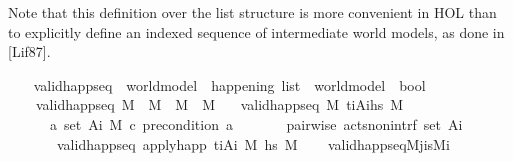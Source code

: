 \begin{isabellebody}
\begin{isamarkuptext}
    Note that this definition over the list structure is more convenient in HOL
    than to explicitly define an indexed sequence  of intermediate world
    models, as done in [Lif87].%
\end{isamarkuptext}\isamarkuptrue%
\ \ \isamarkupfalse%
\ valid{\isacharunderscore}{\kern0pt}happ{\isacharunderscore}{\kern0pt}seq\ {\isacharcolon}{\kern0pt}{\isacharcolon}{\kern0pt}\ {\isachardoublequoteopen}world{\isacharunderscore}{\kern0pt}model\ {\isasymRightarrow}\ happening\ list\ {\isasymRightarrow}\ world{\isacharunderscore}{\kern0pt}model\ {\isasymRightarrow}\ bool{\isachardoublequoteclose}\ \isanewline
\ \ \ \ {\isachardoublequoteopen}valid{\isacharunderscore}{\kern0pt}happ{\isacharunderscore}{\kern0pt}seq\ M\ {\isacharbrackleft}{\kern0pt}{\isacharbrackright}{\kern0pt}\ M{\isacharprime}{\kern0pt}\ {\isasymlongleftrightarrow}\ {\isacharparenleft}{\kern0pt}M\ {\isacharequal}{\kern0pt}\ M{\isacharprime}{\kern0pt}{\isacharparenright}{\kern0pt}{\isachardoublequoteclose}\isanewline
\ \ {\isacharbar}{\kern0pt}\ {\isachardoublequoteopen}valid{\isacharunderscore}{\kern0pt}happ{\isacharunderscore}{\kern0pt}seq\ M\ {\isacharparenleft}{\kern0pt}{\isacharparenleft}{\kern0pt}t\isactrlsub i{\isacharcomma}{\kern0pt}A\isactrlsub i{\isacharparenright}{\kern0pt}{\isacharhash}{\kern0pt}hs{\isacharparenright}{\kern0pt}\ M{\isacharprime}{\kern0pt}\ {\isasymlongleftrightarrow}\ \isanewline
\ \ \ \ \ \ {\isacharparenleft}{\kern0pt}{\isasymforall}a{\isasymin}\ set\ A\isactrlsub i{\isachardot}{\kern0pt}\ M\ \isactrlsup c{\isasymTTurnstile}\isactrlsub {\isacharequal}{\kern0pt}\ precondition\ a{\isacharparenright}{\kern0pt}\isanewline
\ \ \ \ \ \ {\isasymand}\ {\isacharparenleft}{\kern0pt}pairwise\ acts{\isacharunderscore}{\kern0pt}non{\isacharunderscore}{\kern0pt}intrf\ {\isacharparenleft}{\kern0pt}set\ A\isactrlsub i{\isacharparenright}{\kern0pt}{\isacharparenright}{\kern0pt}\isanewline
\ \ \ \ \ \ {\isasymand}\ valid{\isacharunderscore}{\kern0pt}happ{\isacharunderscore}{\kern0pt}seq\ {\isacharparenleft}{\kern0pt}apply{\isacharunderscore}{\kern0pt}happ\ {\isacharparenleft}{\kern0pt}t\isactrlsub i{\isacharcomma}{\kern0pt}A\isactrlsub i{\isacharparenright}{\kern0pt}\ M{\isacharparenright}{\kern0pt}\ hs\ M{\isacharprime}{\kern0pt}{\isachardoublequoteclose}\isanewline
\isanewline
\ \ \isamarkupfalse%
\ valid{\isacharunderscore}{\kern0pt}happ{\isacharunderscore}{\kern0pt}seq{\isacharunderscore}{\kern0pt}M\isactrlsub j{\isacharunderscore}{\kern0pt}is{\isacharunderscore}{\kern0pt}M\isactrlsub i{\isacharcolon}{\kern0pt}\isanewline

\end{isabellebody}
